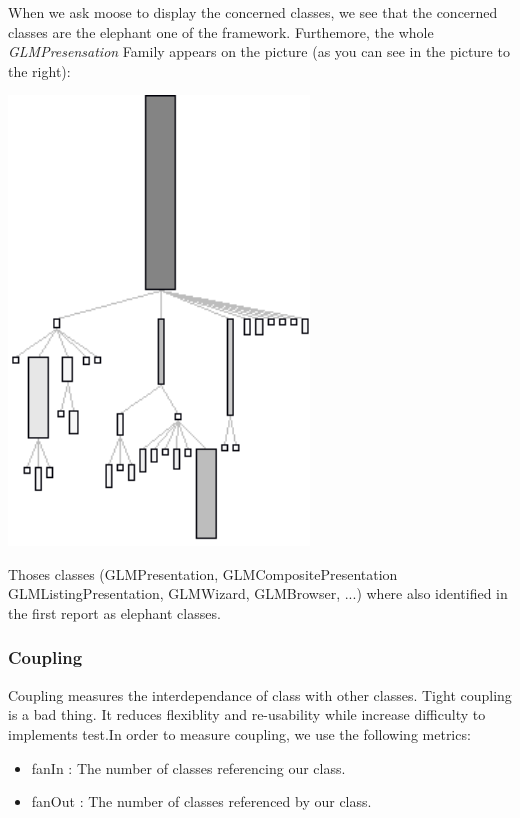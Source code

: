\documentclass[11pt,a4paper]{article}
\begin{document}
\begin{minipage}[t]{0.4\textwidth}
When we ask moose to display the concerned classes, we see that the concerned classes are the elephant one of the framework. Furthemore, the whole \textit{GLMPresensation} Family appears on the picture (as you can see in the picture to the right):

\end{minipage}
\hfill
\begin{minipage}[t]{0.6\textwidth}
    \centering
     \vspace{-1.5ex}
\includegraphics[width=0.6\textwidth]{GLMPresentation_family}
\end{minipage} 


Thoses classes (GLMPresentation, GLMCompositePresentation GLMListingPresentation, GLMWizard, GLMBrowser, ...)  where also identified in the first report as elephant  classes.\\
\subsubsection{Coupling}
Coupling measures the interdependance of class with other classes. Tight coupling is a bad thing. It reduces flexiblity and re-usability while increase difficulty to implements test.In order to measure coupling, we use the following metrics:
\begin{itemize}
\item fanIn : The number of classes referencing our class.
\item fanOut : The number of classes referenced by our class.
\end{itemize} 
\end{document}

